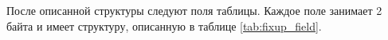 После описанной структуры следуют поля таблицы. Каждое поле занимает 2 байта и
имеет структуру, описанную в таблице \ref{tab:fixup_field}. 


